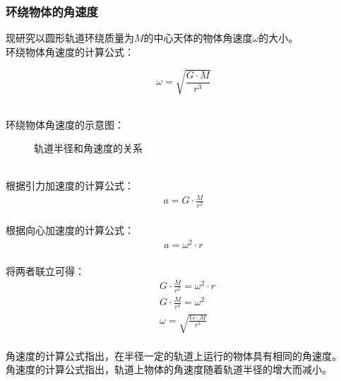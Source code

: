 \documentclass[UTF8]{ctexart}
\begin{document}
\newpage

\subsubsection{环绕物体的角速度}
    \setcounter{equation}{0}
    现研究以圆形轨道环绕质量为$M$的中心天体的物体角速度$\omega$的大小。\\[3mm]
    环绕物体角速度的计算公式：
    \begin{large}
        \begin{equation*}
            \omega=\sqrt{\frac{G\cdot M}{r^3}}
        \end{equation*}
    \end{large}\\
    环绕物体角速度的示意图：
    \begin{figure}[h]
        \begin{center}
            \caption{轨道半径和角速度的关系}
        \end{center}
    \end{figure}\\
    根据引力加速度的计算公式：
    \begin{align}
        a=G\cdot\frac{M}{r^2}
    \end{align}\\
    根据向心加速度的计算公式：
    \begin{align}
        a=\omega^2\cdot r
    \end{align}\\
    将两者联立可得：
    \begin{align}
        &G\cdot\frac{M}{r^2}=\omega^2\cdot r\\[3mm]
        &G\cdot\frac{M}{r^3}=\omega^2\\[3mm]
        &\omega=\sqrt{\frac{G\cdot M}{r^3}}
    \end{align}\\
    角速度的计算公式指出，在半径一定的轨道上运行的物体具有相同的角速度。\\[3mm]
    角速度的计算公式指出，轨道上物体的角速度随着轨道半径的增大而减小。
\end{document}
